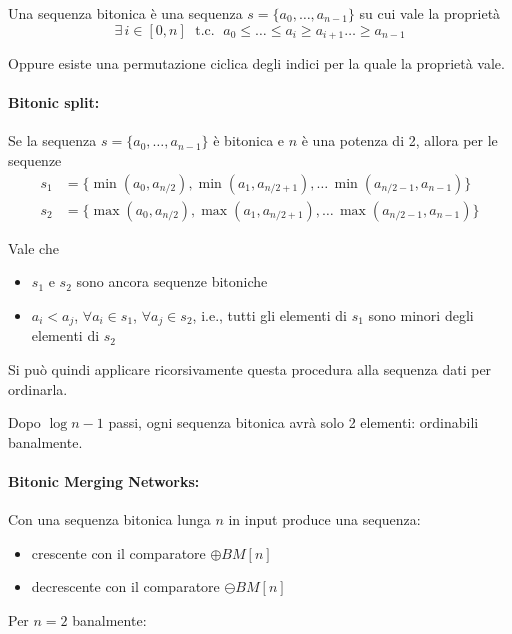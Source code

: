 Una sequenza bitonica è una sequenza $s = \{a_0, \dots, a_{n-1}\}$ su cui vale la proprietà
$$ \exists \, i \in [0,n] \; \text{ t.c. } \; a_0 \leq \dots \leq a_i \geq a_{i+1} \dots \geq a_{n-1} $$

Oppure esiste una permutazione ciclica degli indici per la quale la proprietà vale. 

\paragraph{Bitonic split:} Se la sequenza $s = \{a_0, \dots, a_{n-1}\}$ è bitonica e $n$ è una potenza di 2, allora per le sequenze
\begin{align*}
    s_1 & = \{ \min (a_0, a_{n/2}), \min (a_1, a_{n/2 + 1}), \dots \, \min (a_{n/2 - 1}, a_{n-1}) \} \\
    s_2 & = \{ \max (a_0, a_{n/2}), \max (a_1, a_{n/2 + 1}), \dots \, \max (a_{n/2 - 1}, a_{n-1}) \}
\end{align*}

Vale che 
\begin{itemize}
    \item $s_1$ e $s_2$ sono ancora sequenze bitoniche
    
    \item $a_i < a_j$, $\forall a_i \in s_1$, $\forall a_j \in s_2$, i.e., tutti gli elementi di $s_1$ sono minori degli elementi di $s_2$
\end{itemize}

Si può quindi applicare ricorsivamente questa procedura alla sequenza dati per ordinarla.

Dopo $\log n - 1$ passi, ogni sequenza bitonica avrà solo 2 elementi: ordinabili banalmente.

\paragraph{Bitonic Merging Networks:} Con una sequenza bitonica lunga $n$ in input produce una sequenza: 
\begin{itemize}
    \item crescente con il comparatore $\oplus BM [n]$
    
    \item decrescente con il comparatore $\ominus BM [n]$
\end{itemize}

Per $n = 2$ banalmente:
%     
%     

